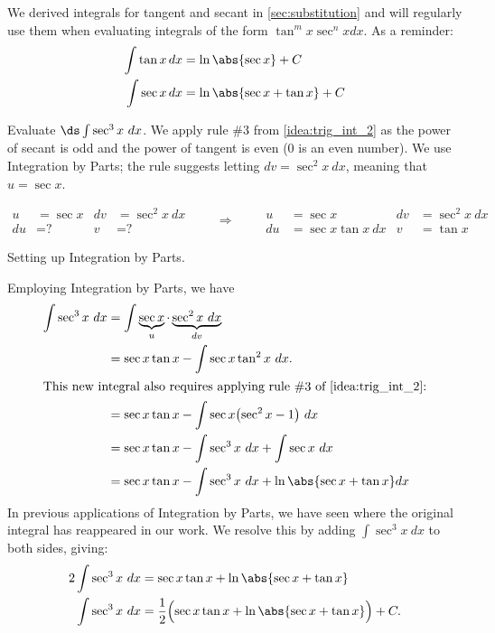 We derived integrals for tangent and secant in \autoref{sec:substitution} and will regularly use them when evaluating integrals of the form $\tan^m x \sec^n x dx$.  As a reminder:
\begin{align*}
 \int\tan x\,dx &=\ln\abs{\sec x}+C \\
 \int\sec x\,dx &=\ln\abs{\sec x+\tan x}+C
\end{align*}

\begin{example}\label{ex_trigint6}
Evaluate $\ds\int \sec^3x\ dx$.
\solution
We apply rule \#3 from \autoref{idea:trig_int_2} as the power of secant is odd and the power of tangent is even (0 is an even number). We use Integration by Parts; the rule suggests letting $dv = \sec^2x\ dx$, meaning that $u = \sec x$. \\
\noindent\begin{minipage}[t]{\linewidth}\noindent%
\captionsetup{type=figure}%
\[
\begin{aligned}
u&= \sec x & dv&=\sec^2 x\ dx\\
du&= \text{?} & v&=\text{?}
\end{aligned}
\qquad\Rightarrow\qquad
\begin{aligned}
u&= \sec x & dv&=\sec^2 x\ dx\\
du&= \sec x\tan x\ dx & v&=\tan x
\end{aligned}
\]
\caption{Setting up Integration by Parts.}\label{fig:trigint1}
\end{minipage}

Employing Integration by Parts, we have
\begin{align*}
\int \sec^3x\ dx
 	&=	\int \underbrace{\sec x}_u\cdot\underbrace{\sec^2 x\ dx}_{dv}\\
	&=	\sec x\tan x - \int \sec x\tan^2x\ dx. \\
\intertext{This new integral also requires applying rule \#3 of \autoref{idea:trig_int_2}:}
	&= \sec x\tan x - \int \sec x \bigl(\sec^2 x-1\bigr)\ dx\\
	&=	\sec x\tan x - \int \sec^3x\ dx + \int \sec x\ dx \\
	&= \sec x\tan x -\int \sec^3x\ dx + \ln\abs{\sec x+\tan x}dx
\end{align*}
In previous applications of Integration by Parts, we have seen where the original integral has reappeared in our work. We resolve this by adding $\int \sec^3x\ dx$ to both sides, giving:
\begin{align*}
2\int \sec^3x\ dx &= \sec x\tan x + \ln\abs{\sec x+\tan x} \\
\int \sec^3x\ dx &= \frac12\Bigl(\sec x\tan x + \ln\abs{\sec x+\tan x}\Bigr)+C.
\end{align*}
\end{example}

